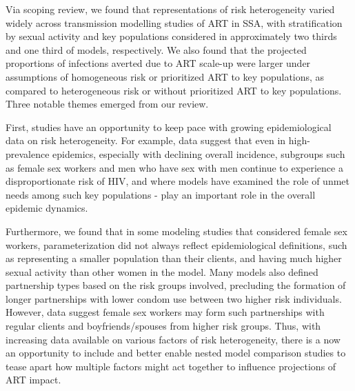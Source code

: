Via scoping review, we found that representations of risk heterogeneity varied widely across
transmission modelling studies of ART in SSA, with
stratification by sexual activity and key populations considered in approximately
two thirds and one third of models, respectively.
We also found that the projected proportions of infections averted due to ART scale-up were
larger under assumptions of homogeneous risk or prioritized ART to key populations,
as compared to heterogeneous risk or without prioritized ART to key populations.  %
Three notable themes emerged from our review.
\par %
First, studies have an opportunity to keep pace with growing epidemiological data on risk heterogeneity.
For example, data suggest that even in high-prevalence epidemics, especially with declining overall incidence,
subgroups such as female sex workers and men who have sex with men continue to experience a disproportionate
risk of HIV, and where models have examined the role of unmet needs among such key populations - play 
an important role in the overall epidemic dynamics. %

Furthermore, we found that in some modeling studies that considered female sex workers,
parameterization did not always
reflect epidemiological definitions, such as
representing a smaller population than their clients,
and having much higher sexual activity than other women in the model. %
\cite{Watts2010,Scorgie2012}
Many models also defined partnership types based on the risk groups involved, %
precluding the formation of longer partnerships with lower condom use between two higher risk individuals. %
However, data suggest female sex workers may form such partnerships with regular clients
and boyfriends/spouses from higher risk groups.\cite{Scorgie2012}  %
Thus, with increasing data available on various factors of risk heterogeneity, 
there is a now an opportunity to include and better enable nested model comparison studies 
to tease apart how multiple factors might act together to influence projections of ART impact. 
\cite{Dodd2010,Hontelez2013}

